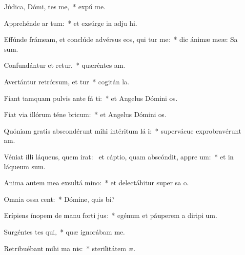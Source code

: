 \item Júdica, Dómi, tes me,~* expú  me.
\item Apprehénde ar  tum:~* et exsúrge in adju hi.
\item Effúnde frámeam, et conclúde advérsus eos, qui tur me:~* dic ánimæ meæ: Sa   sum.
\item Confundántur et retur,~* quæréntes  am.
\item Avertántur retrórsum, et tur~* cogitán  la.
\item Fiant tamquam pulvis ante fá ti:~* et Angelus Dómini  os.
\item Fiat via illórum téne  bricum:~* et Angelus Dómini  os.
\item Quóniam gratis abscondérunt mihi intéritum lá i:~* supervácue exprobravérunt  am.
\item Véniat illi láqueus, quem irat:~\pscross{} et cáptio, quam abscóndit, appre um:~* et in láqueum   sum.
\item Anima autem mea exsultá  mino:~* et delectábitur super sa o.
\item Omnia ossa  cent:~* Dómine, quis  bi?
\item Erípiens ínopem de manu forti jus:~* egénum et páuperem a diripi um.
\item Surgéntes tes qui,~* quæ ignorábam  me.
\item Retribuébant mihi ma  nis:~* sterilitátem  æ.

